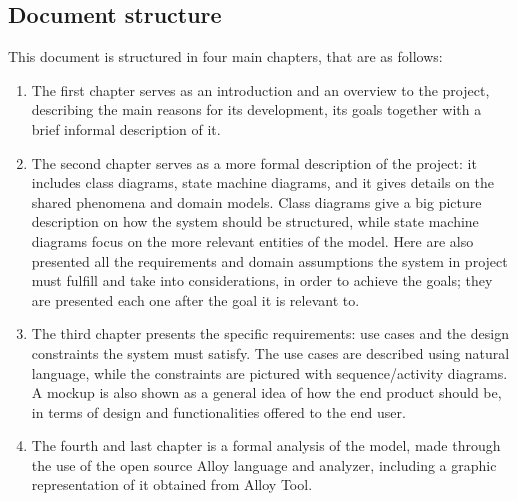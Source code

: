 \subsection{Document structure}
This document is structured in four main chapters, that are as follows:
\begin{enumerate}
	\item The first chapter serves as an introduction and an overview to the project, describing the main reasons for its development, its goals together with a brief informal description of it.

	\item The second chapter serves as a more formal description of the project: it includes class diagrams, state machine diagrams, and it gives details on the shared phenomena and domain models. Class diagrams give a big picture description on how the system should be structured, while state machine diagrams focus on the more relevant entities of the model. Here are also presented all the requirements and domain assumptions the system in project must fulfill and take into considerations, in order to achieve the goals; they are presented each one after the goal it is relevant to.

	\item The third chapter presents the specific requirements: use cases and the design constraints the system must satisfy. The use cases are described using natural language, while the constraints are pictured with sequence/activity diagrams. A mockup is also shown as a general idea of how the end product should be, in terms of design and functionalities offered to the end user.

	\item The fourth and last chapter is a formal analysis of the model, made through the use of the open source Alloy language and analyzer, including a graphic representation of it obtained from Alloy Tool.
\end{enumerate}
